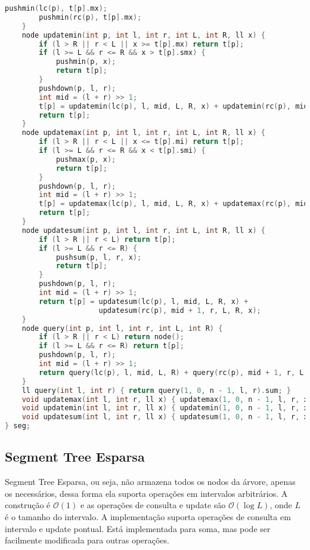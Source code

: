 \documentclass[10pt, a4paper, oneside]{book}
\begin{document}
\begin{lstlisting}[language=C++]
        pushmin(lc(p), t[p].mx);
        pushmin(rc(p), t[p].mx);
    }
    node updatemin(int p, int l, int r, int L, int R, ll x) {
        if (l > R || r < L || x >= t[p].mx) return t[p];
        if (l >= L && r <= R && x > t[p].smx) {
            pushmin(p, x);
            return t[p];
        }
        pushdown(p, l, r);
        int mid = (l + r) >> 1;
        t[p] = updatemin(lc(p), l, mid, L, R, x) + updatemin(rc(p), mid + 1, r, L, R, x);
        return t[p];
    }
    node updatemax(int p, int l, int r, int L, int R, ll x) {
        if (l > R || r < L || x <= t[p].mi) return t[p];
        if (l >= L && r <= R && x < t[p].smi) {
            pushmax(p, x);
            return t[p];
        }
        pushdown(p, l, r);
        int mid = (l + r) >> 1;
        t[p] = updatemax(lc(p), l, mid, L, R, x) + updatemax(rc(p), mid + 1, r, L, R, x);
        return t[p];
    }
    node updatesum(int p, int l, int r, int L, int R, ll x) {
        if (l > R || r < L) return t[p];
        if (l >= L && r <= R) {
            pushsum(p, l, r, x);
            return t[p];
        }
        pushdown(p, l, r);
        int mid = (l + r) >> 1;
        return t[p] = updatesum(lc(p), l, mid, L, R, x) +
                      updatesum(rc(p), mid + 1, r, L, R, x);
    }
    node query(int p, int l, int r, int L, int R) {
        if (l > R || r < L) return node();
        if (l >= L && r <= R) return t[p];
        pushdown(p, l, r);
        int mid = (l + r) >> 1;
        return query(lc(p), l, mid, L, R) + query(rc(p), mid + 1, r, L, R);
    }
    ll query(int l, int r) { return query(1, 0, n - 1, l, r).sum; }
    void updatemax(int l, int r, ll x) { updatemax(1, 0, n - 1, l, r, x); }
    void updatemin(int l, int r, ll x) { updatemin(1, 0, n - 1, l, r, x); }
    void updatesum(int l, int r, ll x) { updatesum(1, 0, n - 1, l, r, x); }
} seg;
\end{lstlisting}
\hfill

\subsection{Segment Tree Esparsa}


Segment Tree Esparsa, ou seja, não armazena todos os nodos da árvore, apenas os necessários, dessa forma ela suporta operações em intervalos arbitrários. A construção é $\mathcal{O}(1)$ e as operações de consulta e update são $\mathcal{O}(\log L)$, onde $L$ é o tamanho do intervalo. A implementação suporta operações de consulta em intervalo e update pontual. Está implementada para soma, mas pode ser facilmente modificada para outras operações. 
\end{document}
